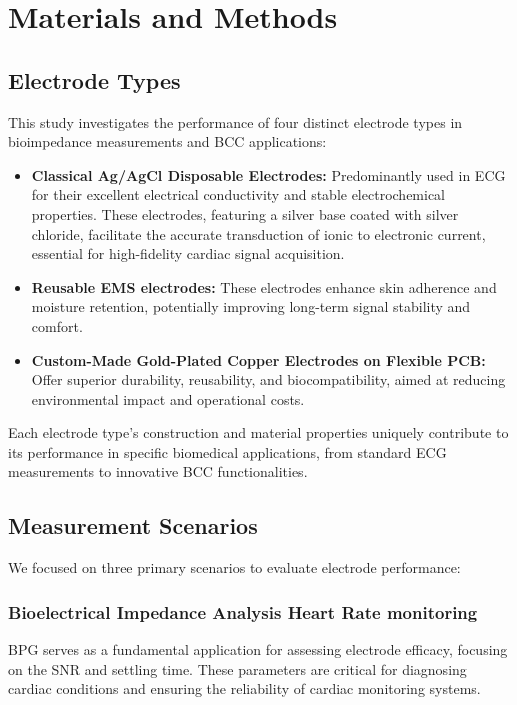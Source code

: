 \documentclass[conference]{IEEEtran}
\newcommand{\notea}[1]{\textcolor{blue}{Armands: #1}}
\begin{document}

%

\section{Materials and Methods}

\subsection{Electrode Types}
This study investigates the performance of four distinct electrode types in bioimpedance measurements and \gls{BCC} applications:
\begin{itemize}
    \item \textbf{Classical Ag/AgCl Disposable Electrodes:} Predominantly used in \gls{ECG}  for their excellent electrical conductivity and stable electrochemical properties. These electrodes, featuring a silver base coated with silver chloride, facilitate the accurate transduction of ionic to electronic current, essential for high-fidelity cardiac signal acquisition.
    
    \item \textbf{Reusable EMS electrodes:} These electrodes enhance skin adherence and moisture retention, potentially improving long-term signal stability and comfort.
    
    \item \textbf{Custom-Made Gold-Plated Copper Electrodes on Flexible PCB:} Offer superior durability, reusability, and biocompatibility, aimed at reducing environmental impact and operational costs.
    
\end{itemize}

Each electrode type's construction and material properties uniquely contribute to its performance in specific biomedical applications, from standard \gls{ECG} measurements to innovative \gls{BCC} functionalities. 


\subsection{Measurement Scenarios}
We focused on three primary scenarios to evaluate electrode performance:

\subsubsection{Bioelectrical Impedance Analysis Heart Rate monitoring}
BPG serves as a fundamental application for assessing electrode efficacy, focusing on the \gls{SNR} and settling time. These parameters are critical for diagnosing cardiac conditions and ensuring the reliability of cardiac monitoring systems.
\end{document}
